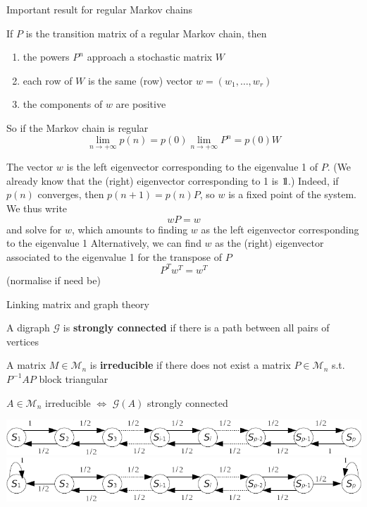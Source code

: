 \documentclass[aspectratio=43]{beamer}
\begin{document}
\begin{frame}{Important result for regular Markov chains}
    \begin{theorem}
    If $P$ is the transition matrix of a regular Markov chain, then
    \begin{enumerate}
        \item the powers $P^n$ approach a stochastic matrix $W$
        \item each row of $W$ is the same (row) vector $w=(w_1,\ldots,w_r)$
        \item the components of $w$ are positive
    \end{enumerate}
    \end{theorem}
    \vfill
    So if the Markov chain is regular
    $$
    \lim_{n\rightarrow +\infty}p(n)=p(0)\lim_{n\rightarrow +\infty}P^n
    =p(0)W
    $$
\end{frame}


\begin{frame}
    The vector $w$ is the left eigenvector corresponding to the eigenvalue 1 of $P$. (We already know that the (right) eigenvector corresponding to 1 is $\nbOne$.)
\vfill
    Indeed, if $p(n)$ converges, then $p(n+1)=p(n)P$, so $w$ is a fixed point of the system. We thus write
    $$
    wP=w
    $$
    and solve for $w$, which amounts to finding $w$ as the left eigenvector corresponding to the eigenvalue 1
    \vfill
    Alternatively, we can find $w$ as the (right) eigenvector associated to the eigenvalue 1 for the transpose of $P$
    $$
    P^Tw^T=w^T
    $$  
    \vfill
    (normalise if need be)      
\end{frame}


\begin{frame}{Linking matrix and graph theory}
\begin{definition}
    A digraph $\mathcal{G}$ is \textbf{strongly connected} if there is a path between all pairs of vertices
\end{definition}
\vfill
\begin{definition}
    A matrix $M\in\mathcal{M}_n$ is \textbf{irreducible} if there does not exist a matrix $P\in\mathcal{M}_n$ s.t. $P^{-1}AP$ block triangular 
\end{definition}
\vfill
\begin{theorem}
    $A\in\mathcal{M}_n$ irreducible $\iff$ $\mathcal{G}(A)$ strongly connected    
\end{theorem}

\begin{center}
    \includegraphics[width=\textwidth]{FIGS/drunk_mans_walk_regular}
    \includegraphics[width=\textwidth]{FIGS/drunk_mans_walk_absorbing}
\end{center}
\end{frame}
\end{document}
